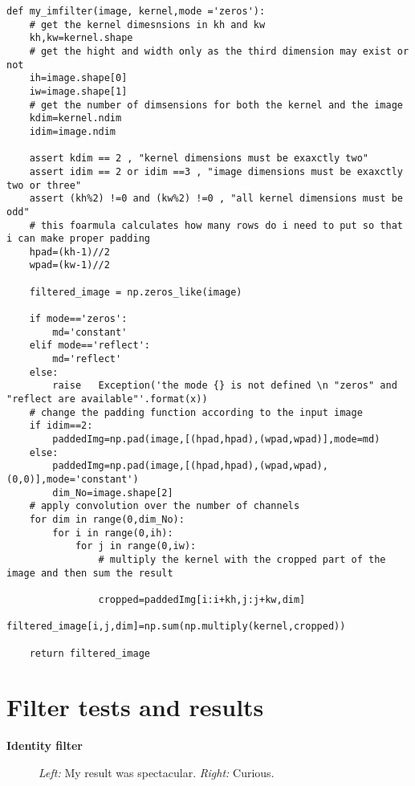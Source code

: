 \begin{lstlisting}
def my_imfilter(image, kernel,mode ='zeros'):
	# get the kernel dimesnsions in kh and kw
	kh,kw=kernel.shape
	# get the hight and width only as the third dimension may exist or not
	ih=image.shape[0]
	iw=image.shape[1]
	# get the number of dimsensions for both the kernel and the image
	kdim=kernel.ndim
	idim=image.ndim
	
	assert kdim == 2 , "kernel dimensions must be exaxctly two"
	assert idim == 2 or idim ==3 , "image dimensions must be exaxctly two or three"
	assert (kh%2) !=0 and (kw%2) !=0 , "all kernel dimensions must be odd"
	# this foarmula calculates how many rows do i need to put so that i can make proper padding
	hpad=(kh-1)//2
	wpad=(kw-1)//2
	
	filtered_image = np.zeros_like(image)
	
	if mode=='zeros':
		md='constant'
	elif mode=='reflect':
		md='reflect'
	else:
		raise   Exception('the mode {} is not defined \n "zeros" and "reflect are available"'.format(x))
	# change the padding function according to the input image
	if idim==2:
		paddedImg=np.pad(image,[(hpad,hpad),(wpad,wpad)],mode=md)
	else:
		paddedImg=np.pad(image,[(hpad,hpad),(wpad,wpad),(0,0)],mode='constant')
		dim_No=image.shape[2]
	# apply convolution over the number of channels
	for dim in range(0,dim_No):
		for i in range(0,ih):
			for j in range(0,iw):
				# multiply the kernel with the cropped part of the image and then sum the result
				
				cropped=paddedImg[i:i+kh,j:j+kw,dim]
				filtered_image[i,j,dim]=np.sum(np.multiply(kernel,cropped))
	
	return filtered_image

\end{lstlisting}

\section*{Filter tests and results}

{\Large \textbf{Identity filter}}

\begin{figure}[h]
    \centering
    \caption{\emph{Left:} My result was spectacular. \emph{Right:} Curious.}
    \label{fig:result1}
\end{figure}



